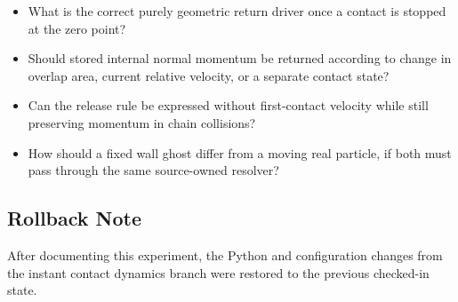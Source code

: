 \begin{itemize}
    \item What is the correct purely geometric return driver once a contact is
    stopped at the zero point?
    \item Should stored internal normal momentum be returned according to change
    in overlap area, current relative velocity, or a separate contact state?
    \item Can the release rule be expressed without first-contact velocity while
    still preserving momentum in chain collisions?
    \item How should a fixed wall ghost differ from a moving real particle, if
    both must pass through the same source-owned resolver?
\end{itemize}

\subsection{Rollback Note}

After documenting this experiment, the Python and configuration changes from the
instant contact dynamics branch were restored to the previous checked-in state.

